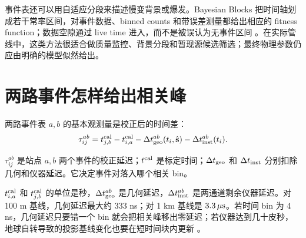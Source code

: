 事件表还可以用自适应分段来描述慢变背景或爆发。Bayesian Blocks 把时间轴划成若干常率区间，对事件数据、binned counts 和带误差测量都给出相应的 fitness function；数据空隙通过 live time 进入，而不是被误认为无事件区间 \citep{2013ApJ...764..167S}。在实际管线中，这类方法很适合做质量监控、背景分段和暂现源候选筛选；最终物理参数仍应由明确的模型似然给出。

\section{两路事件怎样给出相关峰}

两路事件表 \(a,b\) 的基本观测量是校正后的时间差：
\begin{equation}
  \tau_{ij}^{ab}
  =
  t_{j,b}^{\rm cal}
  -
  t_{i,a}^{\rm cal}
  -
  \Delta t_{\rm geo}^{ab}(t_i,\hat{\mathbf{s}})
  -
  \Delta t_{\rm inst}^{ab}(t_i).
  \label{eq:ch07-event-delay}
\end{equation}
\begin{formulaexplain}
\(\tau_{ij}^{ab}\) 是站点 \(a,b\) 两个事件的校正延迟；\(t^{\rm cal}\) 是标定时间；\(\Delta t_{\rm geo}\) 和 \(\Delta t_{\rm inst}\) 分别扣除几何和仪器延迟。它决定事件对落入哪个相关 bin。
\end{formulaexplain}
\(t_{i,a}^{\rm cal}\) 和 \(t_{j,b}^{\rm cal}\) 的单位是秒，\(\Delta t_{\rm geo}^{ab}\) 是几何延迟，\(\Delta t_{\rm inst}^{ab}\) 是两通道剩余仪器延迟。对 100 m 基线，几何延迟最大约 333 ns；对 1 km 基线是 \(3.3\,\mu{\rm s}\)。若时间 bin 为 4 ns，几何延迟只要错一个 bin 就会把相关峰移出零延迟；若仪器达到几十皮秒，地球自转导致的投影基线变化也要在短时间块内更新 \citep{2006MNRAS.369..655H,2006MNRAS.372.1549E,2018RNAAS...2....4K,2020NatAs...4.1164A}。

